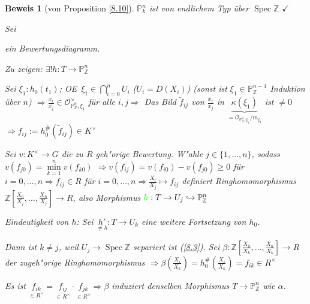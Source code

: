 \documentclass[paper = A4, fontsize=12pt, numbers=noendperiod, chapterprefix=true]{scrbook}
\theoremstyle{break}
\theoremstyle{nonumberbreak}
\newtheorem{bew}{Beweis}
\theoremstyle{nonumberplain}
\DeclareMathOperator{\Spec}{Spec}
\newcommand{\IP}{\mathbb{P}}%
\newcommand{\Z}{\mathbb{Z}}
\newcommand{\calO}{\mathcal{O}}
\newcommand{\X}{\times}
\renewcommand{\OE}{O\!\!E~}
\begin{document}
\begin{bew}[von Proposition \ref{8.10}]
$\IP_k^n$ ist von endlichem Typ \"uber $\Spec \Z$ $\checkmark$

Sei  ein Bewertungsdiagramm.

\emph{Zu zeigen}: $\exists! h: T \to \IP_\Z^n$

Sei $\xi_1: h_0(t_1)$; \OE $\xi_1 \in \bigcap\limits_{i=0}^n U_i$ ($U_i = D(X_i)$) (sonst ist $\xi_1 \in \IP_\Z^{n-1}$ Induktion \"uber $n$) $\Rightarrow \frac{x_i}{x_j} \in \calO_{\IP_\Z^n, \xi_1}^\X$ f\"ur alle $i,j \Rightarrow$ Das Bild $\tilde f_{ij}$ von $\frac{x_i}{x_j}$ in $\underbrace{\kappa(\xi_1)}_{= \calO_{\IP_\Z^n,\xi_1}/m_{\xi_1}}$ ist $\ne 0$ $\Rightarrow f_{ij} := h_0^\#(\tilde f_{ij}) \in K^\X$

Sei $v: K^\X \to G$ die zu $R$ geh"orige Bewertung. W"ahle $j \in \{1,\ldots ,n\}$, sodass $v(f_{j0}) = \min\limits_{k=1}^n v(f_{k0})$ $\Rightarrow v(f_{ij}) = v(f_{i0}) - v(f_{j0}) \ge 0$ f\"ur $i= 0,\ldots ,n \Rightarrow f_{ij} \in R$ f\"ur $i= 0,\ldots ,n \Rightarrow \frac{X_i}{X_j} \mapsto f_{ij}$ definiert Ringhomomorphismus $\Z[\frac{X_0}{X_j},\ldots ,\frac{X_n}{X_j}] \to R$, also Morphismus $\textcolor{color2}{h}: T \to U_j \hookrightarrow \IP_\Z^n$

\emph{Eindeutigkeit von $h$}: Sei $\underset{\ne h}{h'}: T \to U_k$ eine weitere Fortsetzung von $h_0$.

Dann ist $k \ne j$, weil $U_j \to \Spec \Z$ separiert ist (\ref{8.3}). Sei $\beta: \Z[\frac{X_0}{X_k},\ldots ,\frac{X_n}{X_k}] \to R$ der zugeh"orige Ringhomomorphismus $\Rightarrow \beta(\frac{X_i}{X_k}) = h_0^\#(\frac{X_i}{X_k}) = f_{ik} \in R^{\times}$

Es ist $\underset{\in R^\X}{f_{ik}} = \underset{\in R^\X}{f_{ij}} \cdot \underset{\in R^\X}{f_{jk}} \Rightarrow \beta$ induziert denselben Morphismus $T \to \IP_\Z^n$ wie $\alpha$.
\end{bew}

\newpage

\end{document}
